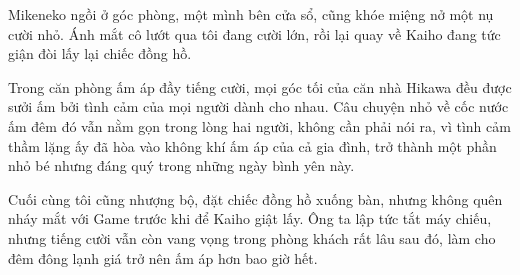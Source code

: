 \documentclass[../main.tex]{subfiles}
\begin{document}
Mikeneko ngồi ở góc phòng, một mình bên cửa sổ, cũng khóe miệng nở một nụ cười nhỏ. Ánh mắt cô lướt qua tôi đang cười lớn, rồi lại quay về Kaiho đang tức giận đòi lấy lại chiếc đồng hồ. 

Trong căn phòng ấm áp đầy tiếng cười, mọi góc tối của căn nhà Hikawa đều được sưởi ấm bởi tình cảm của mọi người dành cho nhau. Câu chuyện nhỏ về cốc nước ấm đêm đó vẫn nằm gọn trong lòng hai người, không cần phải nói ra, vì tình cảm thầm lặng ấy đã hòa vào không khí ấm áp của cả gia đình, trở thành một phần nhỏ bé nhưng đáng quý trong những ngày bình yên này.

Cuối cùng tôi cũng nhượng bộ, đặt chiếc đồng hồ xuống bàn, nhưng không quên nháy mắt với Game trước khi để Kaiho giật lấy. Ông ta lập tức tắt máy chiếu, nhưng tiếng cười vẫn còn vang vọng trong phòng khách rất lâu sau đó, làm cho đêm đông lạnh giá trở nên ấm áp hơn bao giờ hết.
\end{document}
